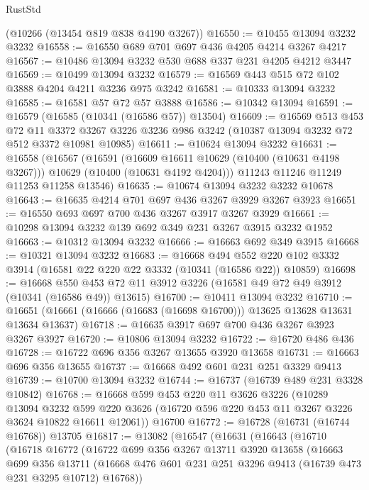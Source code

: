 \begin{lexlean}{RustStd}
\begin{coremodule}
    (@10266 (@13454 @819 @838 @4190 @3267))
@16550 := @10455 @13094 @3232 @3232
@16558 := @16550 @689 @701 @697 @436 @4205 @4214 @3267 @4217
@16567 := @10486 @13094 @3232 @530 @688 @337 @231 @4205 @4212 @3447
@16569 := @10499 @13094 @3232
@16579 := @16569 @443 @515 @72 @102 @3888 @4204 @4211 @3236 @975 @3242
@16581 := @10333 @13094 @3232
@16585 := @16581 @57 @72 @57 @3888
@16586 := @10342 @13094
@16591 := @16579 (@16585 (@10341 (@16586 @57)) @13504)
@16609 := @16569
    @513
    @453
    @72
    @11
    @3372
    @3267
    @3226
    @3236
    @986
    @3242
    (@10387 @13094 @3232 @72 @512 @3372 @10981 @10985)
@16611 := @10624 @13094 @3232
@16631 := @16558
    (@16567
      (@16591
        (@16609 @16611 @10629 (@10400 (@10631 @4198 @3267)))
        @10629
        (@10400 (@10631 @4192 @4204)))
      @11243
      @11246
      @11249
      @11253
      @11258
      @13546)
@16635 := @10674 @13094 @3232 @3232 @10678
@16643 := @16635 @4214 @701 @697 @436 @3267 @3929 @3267 @3923
@16651 := @16550 @693 @697 @700 @436 @3267 @3917 @3267 @3929
@16661 := @10298 @13094 @3232 @139 @692 @349 @231 @3267 @3915 @3232 @1952
@16663 := @10312 @13094 @3232
@16666 := @16663 @692 @349 @3915
@16668 := @10321 @13094 @3232
@16683 := @16668
    @494
    @552
    @220
    @102
    @3332
    @3914
    (@16581 @22 @220 @22 @3332 (@10341 (@16586 @22)) @10859)
@16698 := @16668
    @550
    @453
    @72
    @11
    @3912
    @3226
    (@16581 @49 @72 @49 @3912 (@10341 (@16586 @49)) @13615)
@16700 := @10411 @13094 @3232
@16710 := @16651 (@16661 (@16666 (@16683 (@16698 @16700))) @13625 @13628 @13631 @13634 @13637)
@16718 := @16635 @3917 @697 @700 @436 @3267 @3923 @3267 @3927
@16720 := @10806 @13094 @3232
@16722 := @16720 @486 @436
@16728 := @16722 @696 @356 @3267 @13655 @3920 @13658
@16731 := @16663 @696 @356 @13655
@16737 := @16668 @492 @601 @231 @251 @3329 @9413
@16739 := @10700 @13094 @3232
@16744 := @16737 (@16739 @489 @231 @3328 @10842)
@16768 := @16668
    @599
    @453
    @220
    @11
    @3626
    @3226
    (@10289
      @13094
      @3232
      @599
      @220
      @3626
      (@16720 @596 @220 @453 @11 @3267 @3226 @3624 @10822 @16611 @12061))
    @16700
@16772 := @16728 (@16731 (@16744 @16768)) @13705
@16817 := @13082
    (@16547
      (@16631
        (@16643
          (@16710
            (@16718
              @16772
              (@16722
                @699
                @356
                @3267
                @13711
                @3920
                @13658
                (@16663
                  @699
                  @356
                  @13711
                  (@16668 @476 @601 @231 @251 @3296 @9413 (@16739 @473 @231 @3295 @10712) @16768))

\end{coremodule}
\end{lexlean}
